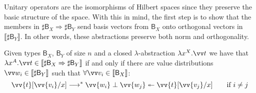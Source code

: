 \documentclass[runningheads,orivec,envcountsame,envcountsect]{llncs}
\newcommand\lra{\longrightarrow}
\def\Lam#1#2#3{\lambda#1^{#2}{.}#3} %
\def\eval{\lra^*}
\def\Arr{\Rightarrow}
\def\sem#1{\llbracket#1\rrbracket}
\newcommand\basis[1]{\ensuremath{\mathsf{B}_{#1}}}
\begin{document}
Unitary operators are the isomorphisms of Hilbert spaces since they preserve the basic structure of the space. With this in mind, the first step is to show that the members in $\sharp\basis{X}\Arr\sharp{\basis{Y}}$ send basis vectors from $\basis{X}$ onto orthogonal vectors in $\sem{\sharp\basis{Y}}$. In other words, these abstractions preserve both norm and orthogonality.

\begin{lemma}\label{lem:BasesIso}
  Given types $\basis{X}$, $\basis{Y}$ of size $n$ and a closed $\lambda$-abstraction $\Lam{x}{X}{\vv t}$ we have that $\Lam{x}{A}{\vv t}\in\sem{\sharp\basis{X}\Arr\sharp\basis{Y}}$ if and only if there are value distributions $\vv w_i\in\sem{\sharp\basis{Y}}$ such that $\forall\vv v_i\in\sem{\basis{X}}$:
  \[
    \vv{t}[\vv{v_i}/x]\eval\vv{w_i}\perp\vv{w_j}\twoheadleftarrow \vv{t}[\vv{v_j}/x] \qquad \text{if } i\neq j
  \]
\end{lemma}
\end{document}
